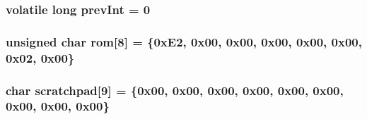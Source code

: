 \hypertarget{OWHumidity2_8ino_add5ef67690d870c53fac0f0d95438bb1}{
\subsubsection[{prev\-Int}]{\setlength{\rightskip}{0pt plus 5cm}volatile long prev\-Int = 0}}\label{OWHumidity2_8ino_add5ef67690d870c53fac0f0d95438bb1}
\hypertarget{OWHumidity2_8ino_a8beb78e2b3f2cb6e34f34861a875ca0b}{
\subsubsection[{rom}]{\setlength{\rightskip}{0pt plus 5cm}unsigned char rom\mbox{[}8\mbox{]} = \{0x\-E2, 0x00, 0x00, 0x00, 0x00, 0x00, 0x02, 0x00\}}}\label{OWHumidity2_8ino_a8beb78e2b3f2cb6e34f34861a875ca0b}
\hypertarget{OWHumidity2_8ino_a8248cc51a33adbb2adf4f80c26f0a166}{
\subsubsection[{scratchpad}]{\setlength{\rightskip}{0pt plus 5cm}char scratchpad\mbox{[}9\mbox{]} = \{0x00, 0x00, 0x00, 0x00, 0x00, 0x00, 0x00, 0x00, 0x00\}}}\label{OWHumidity2_8ino_a8248cc51a33adbb2adf4f80c26f0a166}
